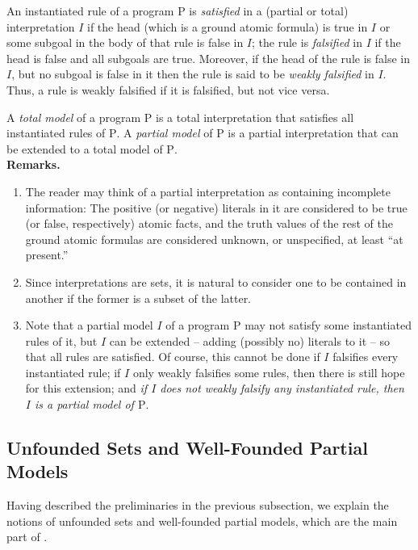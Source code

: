 An instantiated rule of a program $\mathrm{P}$ is \emph{satisfied} in a (partial or total) interpretation $I$ if the head (which is a ground atomic formula) is true in $I$ or some subgoal in the body of that rule is false in $I$; the rule is \emph{falsified} in $I$ if the head is false and all subgoals are true. Moreover, if the head of the rule is false in $I$, but no subgoal is false in it then the rule is said to be \emph{weakly falsified} in $I$. Thus, a rule is weakly falsified if it is falsified, but not vice versa.

A \emph{total model} of a program $\mathrm{P}$ is a total interpretation that satisfies all instantiated rules of $\mathrm{P}$. A \emph{partial model} of $\mathrm{P}$ is a partial interpretation that can be extended to a total model of $\mathrm{P}$.
\ \medskip\\
\noindent\textbf{Remarks.}
\begin{enumerate}[label=(\alph*)]
%
\item The reader may think of a partial interpretation as containing incomplete information: The positive (or negative) literals in it are considered to be true (or false, respectively) atomic facts, and the truth values of the rest of the ground atomic formulas are considered unknown, or unspecified, at least ``at present.''
%
\item Since interpretations are sets, it is natural to consider one to be contained in another if the former is a subset of the latter.
%
\item Note that a partial model $I$ of a program $\mathrm{P}$ may not satisfy some instantiated rules of it, but $I$ can be extended -- adding (possibly no) literals to it -- so that all rules are satisfied. Of course, this cannot be done if $I$ falsifies every instantiated rule; if $I$ only weakly falsifies some rules, then there is still hope for this extension; and \emph{if $I$ does not weakly falsify any instantiated rule, then $I$ is a partial model of $\mathrm{P}$}.
%
\end{enumerate}

\subsection{Unfounded Sets and Well-Founded Partial Models}
Having described the preliminaries in the previous subsection, we explain the notions of unfounded sets and well-founded partial models, which are the main part of \cite{VanGelder}.


